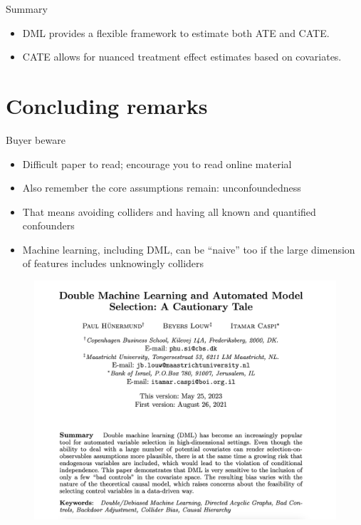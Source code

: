 \documentclass{beamer}
\begin{document}
\begin{frame}{Summary}
  \begin{itemize}
    \item DML provides a flexible framework to estimate both ATE and CATE.
    \item CATE allows for nuanced treatment effect estimates based on covariates.
  \end{itemize}
\end{frame}


\section{Concluding remarks}

\begin{frame}{Buyer beware}
\begin{itemize}

\item Difficult paper to read; encourage you to read online material
\item Also remember the core assumptions remain: unconfoundedness
\item That means avoiding colliders and having all known and quantified confounders
\item Machine learning, including DML, can be ``naive'' too if the large dimension of features includes unknowingly colliders

\end{itemize}

\end{frame}

\begin{frame}{}

  \begin{figure}
    \includegraphics[scale=0.25]{./lecture_includes/paul_dml}
  \end{figure}

\end{frame}
\end{document}
